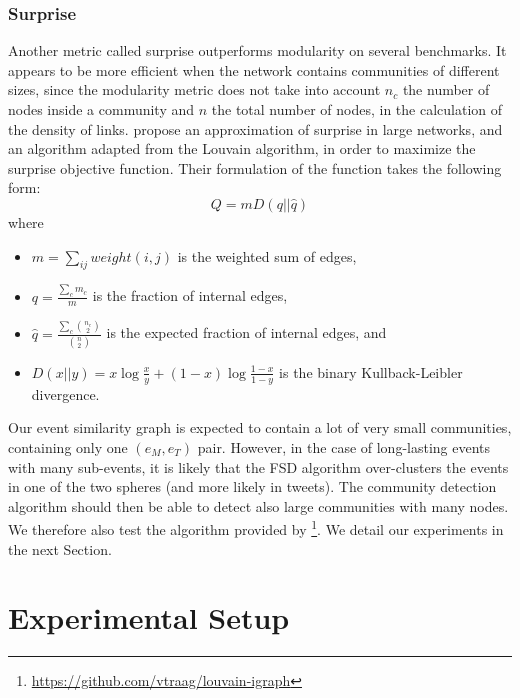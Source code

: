 \subsubsection{Surprise}
Another metric called surprise \citep{aldecoa_deciphering_2011} outperforms modularity on several benchmarks. It appears to be more efficient when the network contains communities of different sizes, since the modularity metric does not take into account $n_c$ the number of nodes inside a community and $n$ the total number of nodes, in the calculation of the density of links. \cite{traag2015detecting} propose an approximation of surprise in large networks, and an algorithm adapted from the Louvain algorithm, in order to maximize the surprise objective function. Their formulation of the function takes the following form:
\begin{equation}
    Q=mD(q || \hat{q})
\end{equation}
where
\begin{itemize}
    \item $m= \sum\limits_{ij} weight(i,j)$ is the weighted sum of edges,
    \item $q = \frac{\sum\limits_{c}m_c}{m}$ is the fraction of internal edges,
    \item $\hat{q} = \frac{\sum\limits_{c}\binom{n_c}{2}}{\binom{n}{2}}$ is the expected fraction of internal edges, and
    \item $D(x||y) = x \log \frac{x}{y} + (1 - x) \log \frac{1-x}{1-y}$ is the binary Kullback-Leibler divergence.
\end{itemize}
Our event similarity graph is expected to contain a lot of very small communities, containing only one $(e_M, e_T)$ pair. However, in the case of long-lasting events with many sub-events, it is likely that the FSD algorithm over-clusters the events in one of the two spheres (and more likely in tweets). The community detection algorithm should then be able to detect also large communities with many nodes. We therefore also test the algorithm provided by \cite{traag2015detecting}\footnote{\url{https://github.com/vtraag/louvain-igraph}}. We detail our experiments in the next Section.

\section{Experimental Setup}

